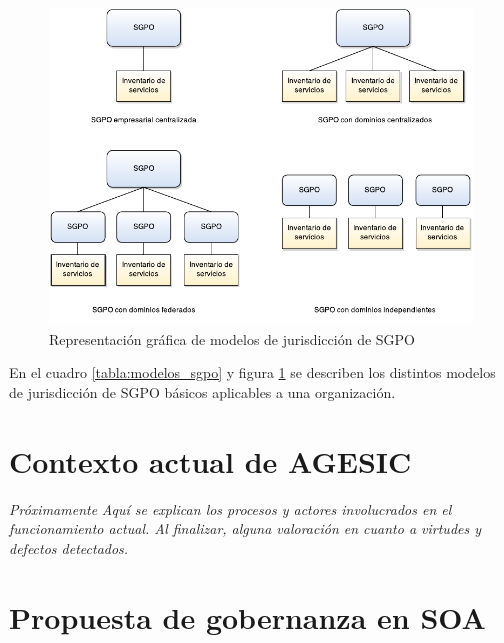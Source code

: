 \documentclass[11pt]{article}
\begin{document}
		\begin{figure}[h]
			\centering
			\includegraphics[width=\linewidth]{modelos_sgpo}
			\caption{Representación gráfica de modelos de jurisdicción de SGPO \cite{Erl:2011:SGG:1983453}}
			\label{imagen:modelos_sgpo}
		\end{figure}

		En el cuadro \ref{tabla:modelos_sgpo} y figura \ref{imagen:modelos_sgpo} se describen los distintos modelos de jurisdicción de SGPO básicos aplicables a una organización.

	\section{Contexto actual de AGESIC}
		\label{sec:contexto_actual}
		\emph{Próximamente}
		\emph{Aquí se explican los procesos y actores involucrados en el funcionamiento actual. Al finalizar, alguna valoración en cuanto a virtudes y defectos detectados.} %

	\section{Propuesta de gobernanza en SOA}
\end{document}
